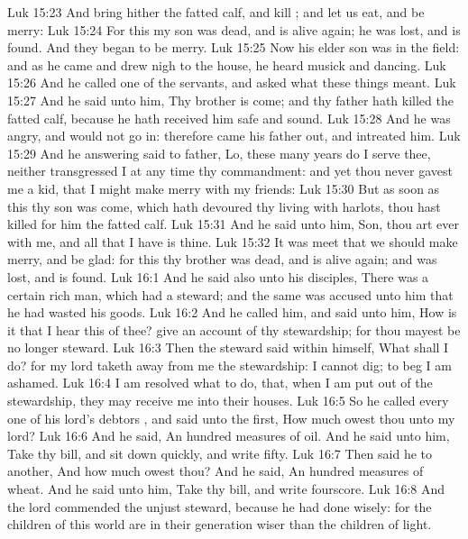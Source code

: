\vs Luk 15:23 And bring hither the fatted calf, and kill ; and let us eat, and be merry:
\vs Luk 15:24 For this my son was dead, and is alive again; he was lost, and is found. And they began to be merry.
\vs Luk 15:25 Now his elder son was in the field: and as he came and drew nigh to the house, he heard musick and dancing.
\vs Luk 15:26 And he called one of the servants, and asked what these things meant.
\vs Luk 15:27 And he said unto him, Thy brother is come; and thy father hath killed the fatted calf, because he hath received him safe and sound.
\vs Luk 15:28 And he was angry, and would not go in: therefore came his father out, and intreated him.
\vs Luk 15:29 And he answering said to  father, Lo, these many years do I serve thee, neither transgressed I at any time thy commandment: and yet thou never gavest me a kid, that I might make merry with my friends:
\vs Luk 15:30 But as soon as this thy son was come, which hath devoured thy living with harlots, thou hast killed for him the fatted calf.
\vs Luk 15:31 And he said unto him, Son, thou art ever with me, and all that I have is thine.
\vs Luk 15:32 It was meet that we should make merry, and be glad: for this thy brother was dead, and is alive again; and was lost, and is found.
\vs Luk 16:1 And he said also unto his disciples, There was a certain rich man, which had a steward; and the same was accused unto him that he had wasted his goods.
\vs Luk 16:2 And he called him, and said unto him, How is it that I hear this of thee? give an account of thy stewardship; for thou mayest be no longer steward.
\vs Luk 16:3 Then the steward said within himself, What shall I do? for my lord taketh away from me the stewardship: I cannot dig; to beg I am ashamed.
\vs Luk 16:4 I am resolved what to do, that, when I am put out of the stewardship, they may receive me into their houses.
\vs Luk 16:5 So he called every one of his lord's debtors , and said unto the first, How much owest thou unto my lord?
\vs Luk 16:6 And he said, An hundred measures of oil. And he said unto him, Take thy bill, and sit down quickly, and write fifty.
\vs Luk 16:7 Then said he to another, And how much owest thou? And he said, An hundred measures of wheat. And he said unto him, Take thy bill, and write fourscore.
\vs Luk 16:8 And the lord commended the unjust steward, because he had done wisely: for the children of this world are in their generation wiser than the children of light.
